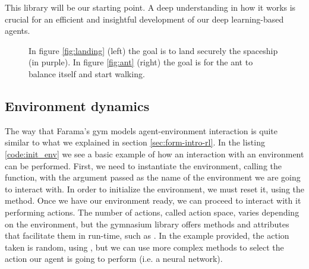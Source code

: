 This library will be our starting point. A deep understanding in how it works is crucial for an efficient and insightful development of our deep learning-based agents.

\begin{figure}[!h] 
	\centering
	\hfill%
	\caption{In figure \ref{fig:landing} (left) the goal is to land securely the spaceship (in purple). In figure \ref{fig:ant} (right) the goal is for the ant to balance itself and start walking.}
	\label{fig:faramas-gym}
\end{figure}

\subsection{Environment dynamics}
\label{sec:env_dyn}

The way that Farama's gym models agent-environment interaction is quite similar to what we explained in section \ref{sec:form-intro-rl}. In the listing \ref{code:init_env} we see a basic example of how an interaction with an environment can be performed. First, we need to instantiate the environment, calling the  function, with the argument passed as the name of the environment we are going to interact with. In order to initialize the environment, we must reset it, using the  method. Once we have our environment ready, we can proceed to interact with it performing actions. The number of actions, called action space, varies depending on the environment, but the gymnasium library offers methods and attributes that facilitate them in run-time, such as . In the example provided, the action taken is random, using , but we can use more complex methods to select the action our agent is going to perform (i.e. a neural network). 

